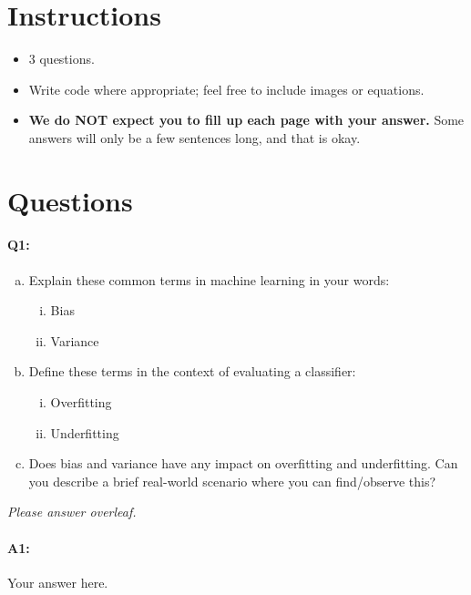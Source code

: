 \section*{Instructions}
\begin{itemize}
  \item 3 questions.
  \item Write code where appropriate; feel free to include images or equations.
  \item \textbf{We do NOT expect you to fill up each page with your answer.} Some answers will only be a few sentences long, and that is okay.
\end{itemize}

\section*{Questions}


\paragraph{Q1:} 

\begin{enumerate} [(a)]
    \item Explain these common terms in machine learning in your words:
    \begin{enumerate} [(i)]
    \item Bias
    \item Variance
    \end{enumerate}
    \item Define these terms in the context of evaluating a classifier:
    \begin{enumerate} [(i)]
    \item Overfitting
    \item Underfitting
    \end{enumerate}
    \item Does bias and variance have any impact on overfitting and underfitting. Can you describe a brief real-world scenario where you can find/observe this?
\end{enumerate}

\emph{Please answer overleaf.}

\pagebreak
\paragraph{A1:} Your answer here.

